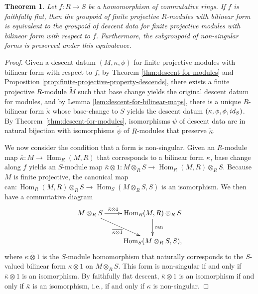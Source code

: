 \documentclass[11pt]{article}
\DeclareMathOperator{\Hom}{Hom}
\newtheorem{thm}{Theorem}[section]
\theoremstyle{definition}
\begin{document}
\begin{thm} \label{thm:descent-for-finite-projective-modules-with-bilinear-form}
Let $f\colon R \to S$ be a homomorphism of commutative rings. If $f$ is faithfully flat, then the groupoid of finite projective $R$-modules with bilinear form is equivalent to the groupoid of descent data for finite projective modules with bilinear form with respect to $f$. Furthermore, the subgroupoid of non-singular forms is preserved under this equivalence.
\end{thm}
\begin{proof}Given a descent datum $(M, \kappa, \phi)$ for finite projective modules with bilinear form with respect to $f$, by Theorem \ref{thm:descent-for-modules} and Proposition \ref{prop:finite-projective-property-descends}, there exists a finite projective $R$-module $\tilde{M}$ such that base change yields the original descent datum for modules, and by Lemma \ref{lem:descent-for-bilinear-maps}, there is a unique $R$-bilinear form $\tilde{\kappa}$ whose base-change to $S$ yields the descent datum $(\kappa, \phi, \phi, {\rm id}_S)$. By Theorem~\ref{thm:descent-for-modules}, isomorphisms $\psi$ of descent data are in natural bijection with isomorphisms $\tilde{\psi}$ of $R$-modules that preserve $\tilde{\kappa}$.

We now consider the condition that a form is non-singular. Given an $R$-module map $\bar{\kappa}\colon M \to \Hom_R(M,R)$ that corresponds to a bilinear form $\kappa$, base change along $f$ yields an $S$-module map $\bar{\kappa} \otimes 1\colon M \otimes_{R} S \to \Hom_R(M,R) \otimes_{R} S$. Because $M$ is finite projective, the canonical map $\mathrm{can}\colon \Hom_R(M,R) \otimes_{R} S \to \Hom_S(M \otimes_{R} S, S)$ is an isomorphism. We then have a commutative diagram
\begin{gather*} \xymatrix{ M \otimes_{R} S \ar[r]^-{\bar{\kappa} \otimes 1} \ar[rd]_-{\overline{\kappa\otimes 1}} & \Hom_R(M,R) \otimes_{R} S \ar[d]^{\mathrm{can}} \\ & \Hom_S(M \otimes_{R} S, S), } \end{gather*}
where $\overline{\kappa\otimes 1}$ is the $S$-module homomorphism that naturally corresponds to the $S$-valued bilinear form $\kappa \otimes 1$ on $M \otimes_{R} S$. This form is non-singular if and only if $\bar{\kappa} \otimes 1$ is an isomorphism. By faithfully flat descent, $\bar{\kappa} \otimes 1$ is an isomorphism if and only if $\bar{\kappa}$ is an isomorphism, i.e., if and only if $\kappa$ is non-singular.
\end{proof}
\end{document}

